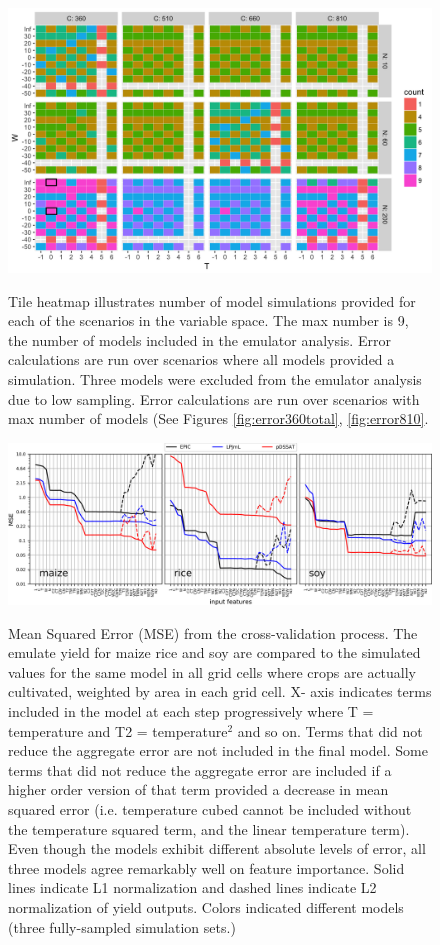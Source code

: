 \documentclass[10pt]{article}
\begin{document}
\begin{figure}[h!]
\includegraphics[width=\textwidth]{s_how_many_simulations.png}\\
\caption{Tile heatmap illustrates number of model simulations provided for each of the scenarios in the variable space. The max number is 9, the number of models included in the emulator analysis. Error calculations are run over scenarios where all models provided a simulation. Three models were excluded from the emulator analysis due to low sampling. Error calculations are run over scenarios with max number of models (See Figures \ref{fig:error360total}, \ref{fig:error810}.}
\label{fig:numbersims}
\end{figure}

\begin{figure}[h!]
\includegraphics[width=\textwidth]{s_feature_selection.png}\\
\caption{Mean Squared Error (MSE) from the cross-validation process. The emulate yield for maize rice and soy are compared to the simulated values for the same model in all grid cells where crops are actually cultivated, weighted by area in each grid cell. X- axis indicates terms included in the model at each step progressively where T = temperature and T2 = temperature$^{2}$ and so on. Terms that did not reduce the aggregate error are not included in the final model. Some terms that did not reduce the aggregate error are included if a higher order version of that term provided a decrease in mean squared error (i.e. temperature cubed cannot be included without the temperature squared term, and the linear temperature term). Even though the models exhibit different absolute levels of error, all three models agree remarkably well on feature importance. Solid lines indicate L1 normalization and dashed lines indicate L2 normalization of yield outputs. Colors indicated different models (three fully-sampled simulation sets.)}
\label{fig:featureselection}
\end{figure}
\end{document}
